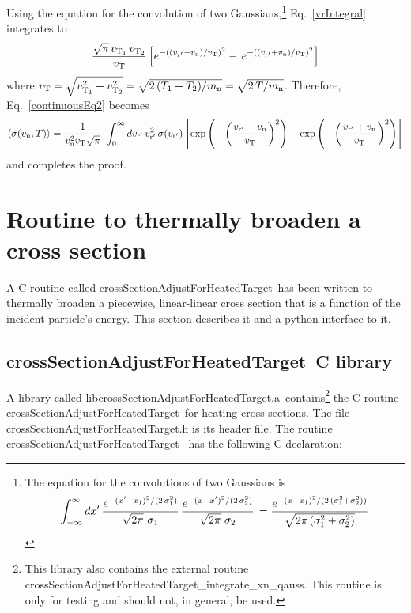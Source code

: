 \documentclass[11pt,twoside]{article}
\def\CRoutine{crossSectionAdjustForHeatedTarget}
\def\CRoutineS{\CRoutine \ }
\def\CLibrary{libcrossSectionAdjustForHeatedTarget.a}
\begin{document}
Using the equation for the convolution of two Gaussians,\footnote{The equation for the convolutions of two Gaussians is
$$
    \int_{-\infty}^\infty dx' \,
    { e^{-(x' - x_1)^2/(2 \, \sigma_1^2)} \over \sqrt{2 \pi} \ \sigma_1 } \, 
    { e^{-(x - x')^2/(2 \, \sigma_2^2)} \over \sqrt{2 \pi} \ \sigma_2 } \, 
    = { e^{-(x - x_1)^2/( 2 \, ( \sigma_1^2 + \sigma_2^2 ) )} \over \sqrt{ 2 \pi \, ( \sigma_1^2 + \sigma_2^2 ) } }
$$} Eq.~\ref{vrIntegral} integrates to
\begin{equation} 
    { \sqrt{ \pi } \, v_{{\rm T}_1} \, v_{{\rm T}_2} \over v_{\rm T} } \left[ e^{-( ( v_{\rm r'} - v_{\rm n} ) / v_{{\rm T}} )^2 } -
        \, e^{-( ( v_{\rm r'} + v_{\rm n} ) / v_{{\rm T}} )^2 } \right]
\end{equation}
where $v_{\rm T} = \sqrt{v_{{\rm T}_1}^2 + v_{{\rm T}_2}^2} = \sqrt{ 2 \, ( T_1 + T_2 ) / m_{\rm n} } = \sqrt{ 2 \, T / m_{\rm n}}$.
Therefore, Eq.~\ref{continuousEq2} becomes
\begin{equation}
    \left<\sigma(v_{\rm n},T)\right> = { 1 \over v_{\rm n}^2 v_{\rm T} \sqrt{\pi} } \ \int_0^\infty dv_{\rm r'} \,
        v_{\rm r'}^2 \, \sigma(v_{\rm r'}) \left[ \exp\left( -\left( { v_{\rm r'} - v_{\rm n} \over v_{\rm T} } \right)^2 \right)
        - \exp\left( -\left( { v_{\rm r'} + v_{\rm n} \over v_{\rm T } } \right)^2 \right) \right]
\end{equation}
and completes the proof.

\section{Routine to thermally broaden a cross section}  \label{Routines}

A C routine called \CRoutineS has been written to thermally broaden a piecewise, linear-linear cross section that
is a function of the incident particle's energy.  This section describes it and a python interface to it.

\subsection{\CRoutineS C library}

A library called \CLibrary \ contains\footnote{This library also contains the external routine 
\CRoutine\_\-integrate\_\-xn\_\-qauss. This routine is only for testing and should not, in general, be used.}
the C-routine \CRoutineS for heating cross sections. The file \CRoutine.h is its header file. The routine \CRoutineS
has the following C declaration:
\end{document}
